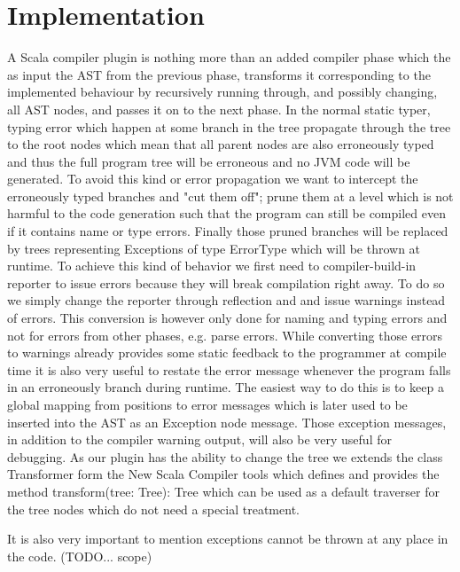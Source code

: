 \section{Implementation}

A Scala compiler plugin is nothing more than an added compiler phase which the
as input the AST from the previous phase, transforms it corresponding to the
implemented behaviour by recursively running through, and possibly changing, all
AST nodes, and passes it on to the next phase.
In the normal static typer, typing error which happen at some branch in the tree
propagate  through the tree to the root nodes which mean that all parent nodes
are also erroneously typed and thus the full program tree will be erroneous and
no JVM code will be generated. To avoid this kind or error propagation we want
to intercept the erroneously typed branches and "cut them off"; prune them at a
level which is not harmful to the code generation such that the program can
still be compiled even if it contains name or type errors. Finally those pruned
branches will be replaced by trees representing Exceptions of type {\ttfamily
ErrorType} which will be thrown at runtime.
To achieve  this kind of behavior we first need to compiler-build-in reporter to
issue errors because they will break compilation right away. To do so we simply
change the reporter through reflection and and issue warnings instead of errors.
This conversion is however only done for naming and typing errors and not for
errors from other phases, e.g. parse errors. While converting those errors to
warnings already provides some static feedback to the programmer at compile time
it is also very useful to restate the error message whenever the program falls
in an erroneously branch during runtime. The easiest way to do this is to keep a
global mapping from positions to error messages which is later used to be
inserted into the AST as an Exception node message. Those exception messages, in
addition to the compiler warning output, will also be very useful for debugging.
As our plugin has the ability to change the tree we extends the class {\ttfamily
Transformer} form the New Scala Compiler tools which defines and provides the
method {\ttfamilydef transform(tree: Tree): Tree} which can be used as a default
traverser for the tree nodes which do not need a special treatment.

It is also very important to mention exceptions cannot be thrown at any place in
the code. (TODO... scope)
